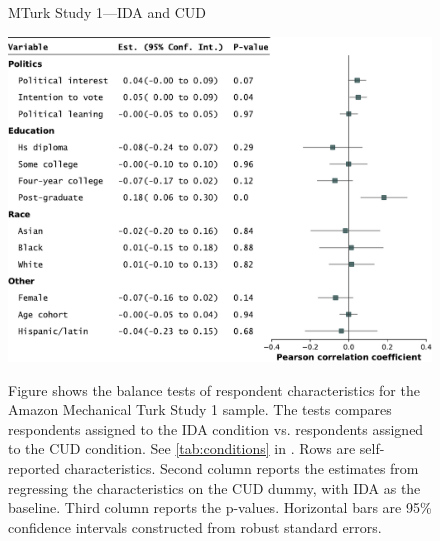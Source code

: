 \begin{center}
	\begin{figure}[H]
		\centering
		\caption{MTurk Study 1---IDA and CUD}
		\includegraphics[width=\textwidth]{../figs/study1-baltest-RW-ips.pdf}
		\label{fig:baltest-24k-rw}
		\caption*{\footnotesize 
			Figure shows the balance tests of respondent characteristics for the Amazon Mechanical Turk Study 1 sample.
			The tests compares respondents assigned to the IDA condition vs. respondents assigned to the CUD condition.
			See \cref{tab:conditions} in .
			Rows are self-reported characteristics.
			Second column reports the estimates from regressing the characteristics on the CUD dummy, with IDA as the baseline.
			Third column reports the p-values.
			Horizontal bars are 95\% confidence intervals constructed from robust standard errors.
		}
	\end{figure}
\end{center}

